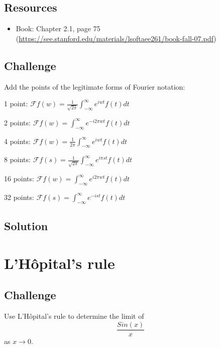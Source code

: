 \subsection*{Resources}
\begin{itemize}
    \item Book: Chapter 2.1, page 75 (\url{https://see.stanford.edu/materials/lsoftaee261/book-fall-07.pdf})
\end{itemize}

\subsection*{Challenge}
Add the points of the legitimate forms of Fourier notation:

1 point: $\displaystyle \mathcal{F}f(w)=\frac{1}{\sqrt{2 \pi}} \int_{-\infty}^{\infty} e^{i w t} f(t) dt$

2 points: $\displaystyle \mathcal{F}f(w)=\int_{-\infty}^{\infty} e^{-i 2 \pi w t} f(t) dt$

4 points: $\displaystyle \mathcal{F}f(w)=\frac{1}{2 \pi} \int_{-\infty}^{\infty} e^{i w t} f(t) dt$

8 points: $\displaystyle \mathcal{F}f(s)=\frac{1}{\sqrt{2 \pi}} \int_{-\infty}^{\infty} e^{i \pi s t} f(t) dt$

16 points: $\displaystyle \mathcal{F}f(w)=\int_{-\infty}^{\infty} e^{i 2 \pi w t} f(t) dt$

32 points: $\displaystyle \mathcal{F}f(s)=\int_{-\infty}^{\infty} e^{-i s t} f(t) dt$

\subsection*{Solution}




\newpage
\section{L'H\^opital's rule}

\subsection*{Challenge}
Use L'H\^opital's rule to determine the limit of
\begin{equation}
    \frac{Sin(x)}{x}
\end{equation}
as $x \rightarrow 0$.

